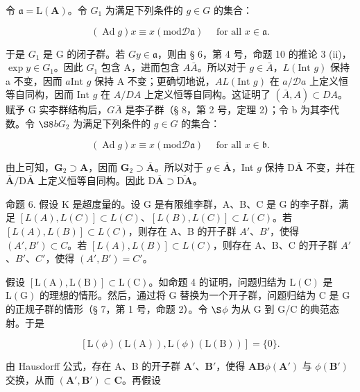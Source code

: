 令 \(\mathfrak{a} = \mathrm{L}(\mathbf{A})\)。令 \(G_{1}\) 为满足下列条件的 \(g \in G\) 的集合：

\[
(\operatorname{Ad} g) x \equiv x (\mathrm{mod} \mathscr {D} \mathfrak {a}) \quad \text { for   all } x \in \mathfrak {a}.
\]

于是 \(G_1\) 是 G 的闭子群。若 \(G\)\(y \in \mathfrak{a}\)，则由 § 6，第 4 号，命题 10 的推论 3 (ii)，\(\exp y \in G_1\)。因此 \(G_1\) 包含 A，进而包含 \(A\)\(\bar{A}\)。所以对于 \(g \in \bar{A}\)，\(L(\text{Int } g)\) 保持 a 不变，因而 \(a\)\(\text{Int } g\) 保持 A 不变；更确切地说，\(A\)\(L(\text{Int } g)\) 在 \(a / \mathcal{D}a\) 上定义恒等自同构，因而 \(\text{Int } g\) 在 \(A / DA\) 上定义恒等自同构。这证明了 \((\bar{A}, A) \subset DA\)。赋予 G 实李群结构后，\(G\)\(\bar{A}\) 是李子群（§ 8，第 2 号，定理 2）；令 b 为其李代数。令 \(\S 8\)\(b\)\(G_2\) 为满足下列条件的 \(g \in G\) 的集合：

\[
(\operatorname{Ad} g) x \equiv x (\mathrm{mod} \mathscr {D} \mathfrak {a}) \quad \text { for   all } x \in \mathfrak {b}.
\]

由上可知，\(\mathbf{G}_2\supset \mathbf{A}\)，因而 \(\mathbf{G}_2\supset \overline{\mathbf{A}}\)。所以对于 \(g\in \overline{\mathbf{A}}\)，Int \(g\) 保持 \(\mathrm{D}\overline{\mathbf{A}}\) 不变，并在 \(\overline{\mathbf{A}} / \mathrm{D}\overline{\mathbf{A}}\) 上定义恒等自同构。因此 \(\mathrm{D}\overline{\mathbf{A}}\supset \overline{\mathrm{D}\mathbf{A}}\)。

命题 6. 假设 K 是超度量的。设 G 是有限维李群，A、B、C 是 G 的李子群，满足 \([L(A), L(C)] \subset L(C)\)、\([L(B), L(C)] \subset L(C)\)。若 \([L(A), L(B)] \subset L(C)\)，则存在 A、B 的开子群 \(A'\)、\(B'\)，使得 \((A', B') \subset C\)。若 \([L(A), L(B)] \subset L(C)\)，则存在 A、B、C 的开子群 \(A'\)、\(B'\)、\(C'\)，使得 \((A', B') = C'\)。

假设 \([\mathrm{L}(\mathrm{A}),\mathrm{L}(\mathrm{B})]\subset\mathrm{L}(\mathrm{C})\)。如命题 4 的证明，问题归结为 \(\mathrm{L}(\mathrm{C})\) 是 \(\mathrm{L}(\mathrm{G})\) 的理想的情形。然后，通过将 G 替换为一个开子群，问题归结为 C 是 G 的正规子群的情形（§ 7，第 1 号，命题 2）。令 \(\S\)\(\phi\) 为从 G 到 G/C 的典范态射。于是

\[
[ \mathrm{L} (\phi) (\mathrm{L} (\mathrm{A})), \mathrm{L} (\phi) (\mathrm{L} (\mathrm{B})) ] = \{0 \}.
\]

由 Hausdorff 公式，存在 A、B 的开子群 \(\mathbf{A}'\)、\(\mathbf{B}'\)，使得 \(\mathbf{A}\)\(\mathbf{B}\)\(\phi(\mathbf{A}')\) 与 \(\phi(\mathbf{B}')\) 交换，从而 \((\mathbf{A}', \mathbf{B}') \subset \mathbf{C}\)。再假设

